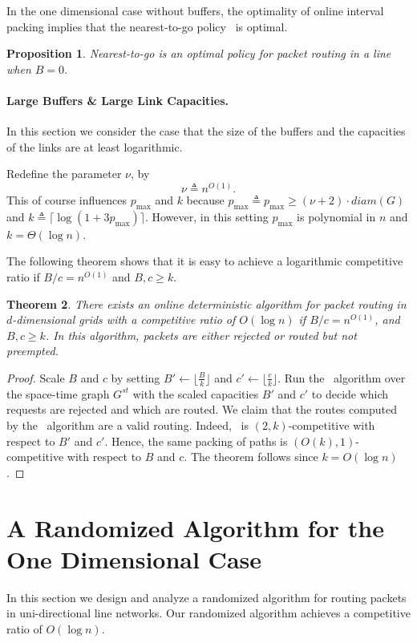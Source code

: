 \documentclass[11pt]{article}
\newtheorem{theorem}{Theorem}
\newtheorem{proposition}[theorem]{Proposition}
\newcommand{\route}{\text{\sc{ipp}}}
\newcommand{\IPP}{\route}
\newcommand{\pmax}{p_{\max}}
\newcommand{\eqdf}{\triangleq}
\newenvironment{proof sketch}[1]{\noindent {\emph{Proof sketch of #1:}}}{\hfill \qed}
\newcommand{\diam}{\textit{diam}}
\begin{document}
In the one dimensional case without buffers, the optimality of online interval
packing implies that the nearest-to-go policy~\cite{AKOR} is optimal.
\begin{proposition}
Nearest-to-go is an optimal policy for packet routing in a line when $B=0$.
\end{proposition}

\paragraph{Large Buffers \& Large Link Capacities.}\label{sec:largeBc}
In this section we consider the case that the size of the buffers and the capacities
of the links are at least logarithmic.

Redefine the parameter $\nu$, by $$\nu \triangleq
n^{O(1)}.$$  This of course influences $\pmax$ and $k$
because $\pmax\triangleq \pmax\geq
  (\nu+2)\cdot \diam(G)$ and $k\eqdf \lceil \log (1+3\pmax) \rceil$.
However, in this setting $\pmax$ is polynomial in $n$ and $k=\Theta(\log n)$.

The following theorem shows that it is easy to achieve a logarithmic competitive
ratio if $B/c=n^{O(1)}$ and $B,c\geq k$.
\begin{theorem}\label{thm:largeBc}
  There exists an online deterministic algorithm for packet routing in
  $d$-dimensional grids with a competitive ratio of $O(\log n)$ if $B/c=n^{O(1)}$,
  and $B,c\geq k$. In this algorithm, packets are either rejected or routed but not
  preempted.
\end{theorem}

\begin{proof}Scale $B$ and $c$ by setting $B' \gets \lfloor{\frac Bk}\rfloor$ and $c' \gets
  \lfloor{\frac ck}\rfloor $.  Run the \IPP\ algorithm over the space-time graph
  $G^{st}$ with the scaled capacities $B'$ and $c'$ to decide which requests are
  rejected and which are routed. We claim that the routes computed by the \IPP\
  algorithm are a valid routing. Indeed, \IPP\ is $(2,k)$-competitive with respect to
  $B'$ and $c'$. Hence, the same packing of paths is $(O(k),1)$-competitive
  with respect to $B$ and $c$.
  The theorem follows since $k=O(\log n)$.
\end{proof}


\section{A Randomized Algorithm for the One Dimensional Case}
\label{sec:randalg} In this section we design and analyze a
randomized algorithm for routing packets in uni-directional
line networks. Our randomized algorithm achieves a
competitive ratio of $O(\log n)$.
\end{document}
